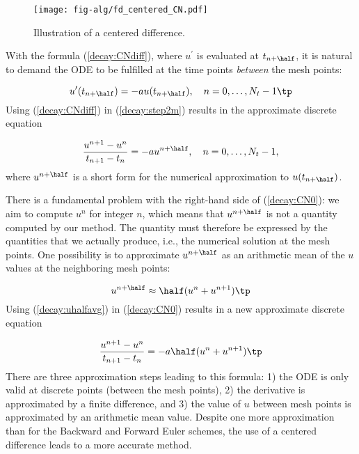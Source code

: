 \documentclass[graybox,sectrefs,envcountresetchap,open=right,final]{svmonodo}
\begin{document}
\begin{figure}[!ht]  %
  \centerline{\texttt{[image: fig-alg/fd\_centered\_CN.pdf]}}
  \caption{
  Illustration of a centered difference. \label{decay:sketch:CN}
  }
\end{figure}


With the formula (\ref{decay:CNdiff}), where $u^{\prime}$ is evaluated at
$t_{n+\half}$, it is natural to demand the
ODE to be fulfilled at the time points \emph{between} the mesh points:

\begin{equation}
u^{\prime}(t_{n+\half}) = -au(t_{n+\half}),\quad n=0,
\ldots,N_t-1\tp
\label{decay:step2m}
\end{equation}
Using (\ref{decay:CNdiff}) in (\ref{decay:step2m}) results in
the approximate discrete equation

\begin{equation}
\frac{u^{n+1}-u^n}{t_{n+1}-t_n} = -au^{n+\half},\quad n=0,\ldots,N_t-1,
\label{decay:CN0}
\end{equation}
where $u^{n+\half}$ is a short form for the numerical approximation
to $u(t_{n+\half})$.

There is a fundamental problem with the right-hand side of
(\ref{decay:CN0}): we aim to compute $u^n$ for integer $n$, which means
that $u^{n+\half}$ is not a quantity computed by our method. The
quantity must
therefore be
expressed by the quantities that we actually produce, i.e.,
the numerical solution at the
mesh points. One possibility is to approximate $u^{n+\half}$
as an arithmetic mean of the $u$ values at the neighboring mesh points:


\begin{equation}
u^{n+\half} \approx \half (u^n + u^{n+1})\tp
\label{decay:uhalfavg}
\end{equation}
Using (\ref{decay:uhalfavg}) in (\ref{decay:CN0}) results in a new
approximate discrete equation

\begin{equation}
\frac{u^{n+1}-u^n}{t_{n+1}-t_n} = -a\half (u^n + u^{n+1})\tp
\label{decay:CN1}
\end{equation}
There are three approximation steps leading to this formula:
1) the ODE is only valid at discrete points (between the mesh points),
2) the derivative is approximated by a finite difference, and 3) the
value of $u$ between mesh points is approximated by an arithmetic mean
value. Despite one more approximation than for the Backward and Forward
Euler schemes, the use of a centered difference leads to a more
accurate method.
\end{document}

